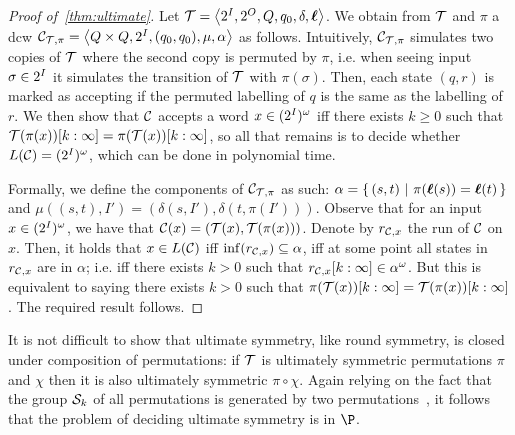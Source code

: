 \begin{proof}[Proof of~\cref{thm:ultimate}]
Let $\mathcal{T}=\left< 2^{I},2^{O},Q,q_0,\delta,\boldsymbol{\ell}\right>$. We obtain from $\mathcal{T}$ and $\pi$ a \gls{dcw} $\mathcal{C}_{\mathcal{T},\pi}=\left< Q\times Q,2^{I},(q_0, q_0),\mu,\alpha\right>$ as follows. Intuitively, $\mathcal{C}_{\mathcal{T},\pi}$ simulates two copies of $\mathcal{T}$ where the second copy is permuted by $\pi$, i.e. when seeing input $\sigma\in 2^{I}$ it simulates the transition of $\mathcal{T}$ with $\pi(\sigma)$. Then, each state $(q,r)$ is marked as accepting if the permuted labelling of $q$ is the same as the labelling of $r$.
We then show that $\mathcal{C}$ accepts a word $x\in (2^{I})^\omega$ iff there exists $k\ge 0$ such that $\mathcal{T}(\pi(x))[k:\infty] = \pi(\mathcal{T}(x))[k:\infty]$, so all that remains is to decide whether $L(\mathcal{C})=(2^{I})^\omega$, which can be done in polynomial time.

Formally, we define the components of $\mathcal{C}_{\mathcal{T}, \pi}$ as such: $\alpha=\left\{\,(s,t)\ \middle|\ \pi(\boldsymbol{\ell}(s))=\boldsymbol{\ell}(t)\,\right\}$ and $\mu\left((s,t),I'\right)=\left( \delta(s,I'), \delta(t, \pi(I')) \right)$. Observe that for an input $x\in (2^{I})^\omega$,
we have that $\mathcal{C}(x)=\left(\mathcal{T}(x), \mathcal{T}(\pi(x))\right)$.
Denote by $r_{\mathcal{C},x}$ the run of $\mathcal{C}$ on $x$. Then, it holds that $x\in L(\mathcal{C})$ iff $\inf(r_{\mathcal{C},x})\subseteq \alpha$, iff at some point all states in $r_{\mathcal{C},x}$ are in $\alpha$; i.e. iff there exists $k>0$ such that $r_{\mathcal{C},x}[k:\infty]\in \alpha^\omega$. But this is equivalent to saying there exists $k>0$ such that $\pi(\mathcal{T}(x))[k:\infty] = \mathcal{T}(\pi(x))[k:\infty]$. The required result follows.
\end{proof}

It is not difficult to show that ultimate symmetry, like round symmetry, is closed under composition of permutations: if $\mathcal{T}$ is ultimately symmetric \WRT permutations $\pi$ and $\chi$ then it is also ultimately symmetric \WRT $\pi\circ\chi$. Again relying on the fact that the group $\mathcal{S}_k$ of all permutations is generated by two permutations~\cite{Cameron1999}, it follows that the problem of deciding ultimate symmetry is in $\P$.
